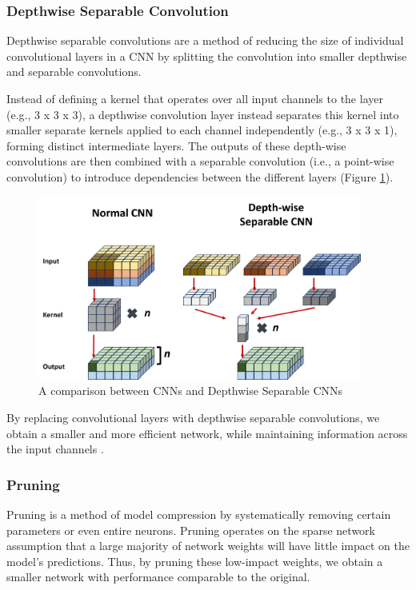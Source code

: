 \documentclass{article}
\begin{document}
\subsubsection{Depthwise Separable Convolution}\label{sec:dwpcnn}
Depthwise separable convolutions are a method of reducing the size of individual convolutional layers in a CNN by splitting the convolution into smaller depthwise and separable convolutions.

Instead of defining a kernel that operates over all input channels to the layer (e.g., 3 x 3 x 3), a depthwise convolution layer instead separates this kernel into smaller separate kernels applied to each channel independently (e.g., 3 x 3 x 1), forming distinct intermediate layers. The outputs of these depth-wise convolutions are then combined with a separable convolution (i.e., a point-wise convolution) to introduce dependencies between the different layers (Figure \ref{fig:dwscnn}).
\begin{figure}[h]
    \centering
    \includegraphics[width=0.95\textwidth]{figures/cnn_diagram_final.png}
    \caption{A comparison between CNNs and Depthwise Separable CNNs}
    \label{fig:dwscnn}
\end{figure}

By replacing convolutional layers with depthwise separable convolutions, we obtain a smaller and more efficient network, while maintaining information across the input channels \cite{Chollet2017}.

\subsubsection{Pruning}\label{sec:pruning}
Pruning is a method of model compression by systematically removing certain parameters or even entire neurons. Pruning operates on the sparse network assumption that a large majority of network weights will have little impact on the model's predictions. Thus, by pruning these low-impact weights, we obtain a smaller network with performance comparable to the original.
\end{document}
